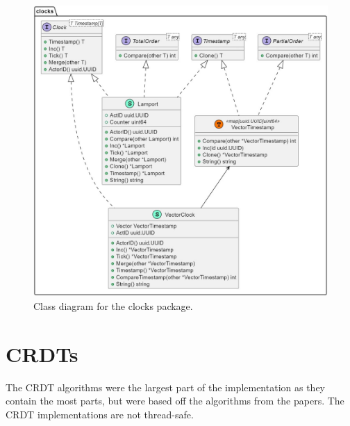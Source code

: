 \documentclass[12pt]{report}
\begin{document}
\begin{figure}[h]
    \centering
    \includegraphics[width=1\textwidth]{images/clocks_impl.jpg}
    \caption{Class diagram for the clocks package.}
    \label{fig:clockimpl}
\end{figure}


\section{CRDTs}
The CRDT algorithms were the largest part of the implementation as they contain the most parts, but were based off the algorithms from the papers. The CRDT implementations are not thread-safe.
\end{document}
